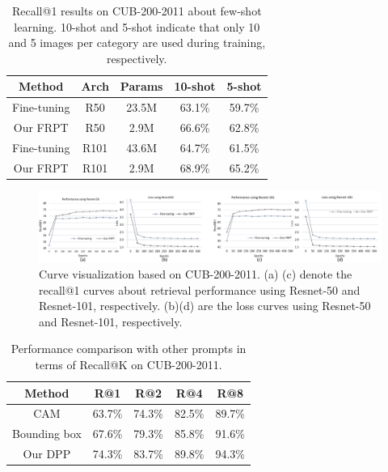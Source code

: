 \documentclass[letterpaper]{article} %
\begin{document}
\begin{table}\centering

	\begin{tabular}{c|c|c||c|c}
		\hline
		\hline
		Method & Arch & Params & 10-shot & 5-shot \\
		\hline
		\hline
		Fine-tuning & R50 &  23.5M  & 63.1\% & 59.7\%  \\
		Our FRPT & R50 &  2.9M  & 66.6\% &  62.8\%  \\
		Fine-tuning & R101 & 43.6M  & 64.7\%  & 61.5\% \\
		Our FRPT & R101 & 2.9M & 68.9\% & 65.2\% \\
		\hline
		\hline

\end{tabular}
	\caption{  Recall@1 results on CUB-200-2011 about few-shot learning. 10-shot and 5-shot indicate that only 10 and 5 images per category are used during training, respectively.
}
\end{table}

\begin{figure}[t]
\begin{center}
  \includegraphics[width=0.93\linewidth]{vce}
\end{center}
  \caption{Curve visualization based on CUB-200-2011. (a) (c) denote the recall@1 curves about retrieval performance using Resnet-50 and Resnet-101, respectively. (b)(d) are the loss curves using Resnet-50 and Resnet-101, respectively.
  }

\end{figure}

\begin{table}\centering

\begin{tabular}{c||cccc}
\hline \hline
Method & R@1 & R@2 & R@4 & R@8 \\
\hline
CAM & 63.7\% & 74.3\% & 82.5\%  &89.7\% \\
Bounding box & 67.6\% & 79.3\%& 85.8\%& 91.6\% \\
\hline
Our DPP &74.3\% & 83.7\% & 89.8\% &94.3\% \\
\hline \hline
\end{tabular}
\caption{Performance comparison with other prompts in terms of Recall@K on CUB-200-2011.}
\end{table}
\end{document}
